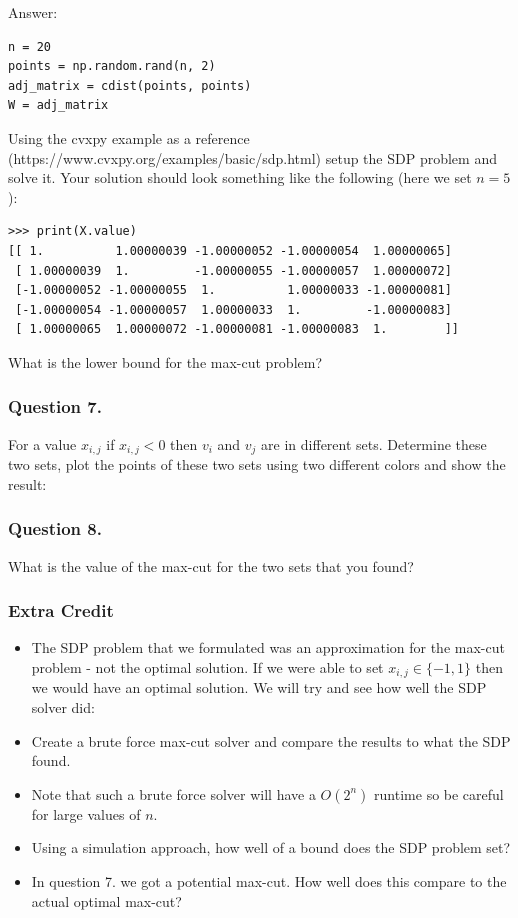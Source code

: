 \documentclass{article}
\begin{document}
Answer:
\begin{verbatim}
n = 20
points = np.random.rand(n, 2)
adj_matrix = cdist(points, points)
W = adj_matrix
\end{verbatim}

Using the cvxpy example as a reference (https://www.cvxpy.org/examples/basic/sdp.html) setup the SDP problem and solve it.
Your solution should look something like the following (here we set \( n = 5 \)):

\begin{verbatim}
>>> print(X.value)
[[ 1.          1.00000039 -1.00000052 -1.00000054  1.00000065]
 [ 1.00000039  1.         -1.00000055 -1.00000057  1.00000072]
 [-1.00000052 -1.00000055  1.          1.00000033 -1.00000081]
 [-1.00000054 -1.00000057  1.00000033  1.         -1.00000083]
 [ 1.00000065  1.00000072 -1.00000081 -1.00000083  1.        ]]
\end{verbatim}

What is the lower bound for the max-cut problem?

\subsubsection{Question 7.}
For a value \( x_{i, j} \) if \( x_{i, j} < 0 \) then \( v_i \) and \( v_j \) are in different sets.
Determine these two sets, plot the points of these two sets using two different colors and show the result:

\subsubsection{Question 8.}
What is the value of the max-cut for the two sets that you found?


\subsubsection{Extra Credit}
\begin{itemize}
\item\label{item:1} The SDP problem that we formulated was an approximation for the max-cut problem - not the optimal solution. If we were able to set \( x_{i, j} \in \{ -1, 1 \} \) then we would have an optimal solution. We will try and see how well the SDP solver did:
\item\label{item:2}
Create a brute force max-cut solver and compare the results to what the SDP found.
\item\label{item:3}
Note that such a brute force solver will have a \( O(2^n) \) runtime so be careful for large values of \( n \).
\item\label{item:4}
Using a simulation approach, how well of a bound does the SDP problem set?
\item\label{item:5}
In question 7. we got a potential max-cut. How well does this compare to the actual optimal max-cut?
\end{itemize}
\end{document}
